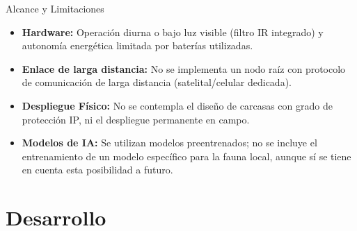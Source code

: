 \documentclass[10pt]{beamer}
\begin{document}
\begin{frame}{Alcance y Limitaciones}
  \begin{itemize}
    \setlength{\itemsep}{1.0em}
    \item \textbf{Hardware:} Operación diurna o bajo luz visible (filtro IR integrado) y autonomía energética limitada por baterías utilizadas.
    \item \textbf{Enlace de larga distancia:} No se implementa un nodo raíz con protocolo de comunicación de larga distancia (satelital/celular dedicada).
    \item \textbf{Despliegue Físico:} No se contempla el diseño de carcasas con grado de protección IP, ni el despliegue permanente en campo.
    \item \textbf{Modelos de IA:} Se utilizan modelos preentrenados; no se incluye el entrenamiento de un modelo específico para la fauna local, aunque sí se tiene en cuenta esta posibilidad a futuro.
  \end{itemize}
\end{frame}

\section{Desarrollo}
\end{document}
